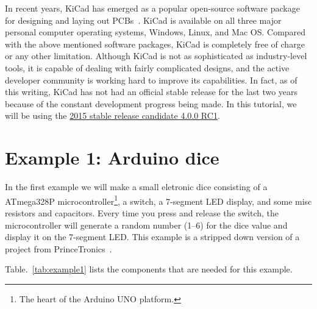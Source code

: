 \documentclass[12pt,letterpaper]{scrartcl}
\begin{document}
In recent years, KiCad has emerged as a popular open-source software package for designing and laying out PCBs~\cite{kicad}. KiCad is available on all three major personal computer operating systems, Windows, Linux, and Mac OS. 
Compared with the above mentioned software packages, KiCad is completely free of charge or any other limitation. Although KiCad is not as sophisticated as industry-level tools, it is capable of dealing with fairly complicated designs, and the active developer community is working hard to improve its capabilities. In fact, as of this writing, KiCad has not had an official stable release for the last two years because of the constant development progress being made. In this tutorial, we will be using the \href{http://kicad-pcb.org/download/windows/}{2015 stable release candidate 4.0.0 RC1}.

\newpage
\section{Example 1: Arduino dice}
In the first example we will make a small eletronic dice consisting of a ATmega328P microcontroller\footnote{The heart of the Arduino UNO platform.}, a switch, a 7-segment LED display, and some misc resistors and capacitors. Every time you press and release the switch, the microcontroller will generate a random number (1--6) for the dice value and display it on the 7-segment LED. This example is a stripped down version of a project from PrinceTronics~\cite{dice}. 

Table.~\ref{tab:example1} lists the components that are needed for this example.
\end{document}
